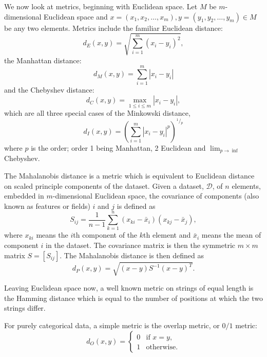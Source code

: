 \documentclass[a4paper]{report}
\newcommand{\dset}{\mathcal{D}}
\newcommand{\prettyfrac}[2]{^#1\!/\!_#2}
\begin{document}
We now look at metrics, beginning with Euclidean space.  Let $M$ be
$m$-dimensional Euclidean space and $x=(x_1,x_2,\dotsc,x_m),
y=(y_1,y_2,\dotsc,y_m) \in M$ be any two elements.  Metrics include the
familiar Euclidean distance:
\begin{equation*}
  d_E(x,y) = \sqrt{\sum_{i=1}^{m} (x_i - y_i)^2},
\end{equation*}
the Manhattan distance:
\begin{equation*}
  d_{M}(x,y) = \sum_{i=1}^{m} |x_i - y_i|
\end{equation*}
and the Chebyshev distance:
\begin{equation*}
  d_C(x,y) = \max_{1 \leq i \leq m} |x_i - y_i|,
\end{equation*}
which are all three special cases of the Minkowski distance,
\begin{equation*}
  d_{I}(x,y) = \left(\sum_{i=1}^{m} |x_i - y_i|^{p}\right)^{\prettyfrac{1}{p}}
\end{equation*}
where $p$ is the order; order 1 being Manhattan, 2 Euclidean and $\lim_{p \to
  \inf}$ Chebyshev.

The Mahalanobis distance \citep{mahalanobis30distance} is a metric which is
equivalent to Euclidean distance on scaled principle components of the
dataset.  Given a dataset, $\dset$, of $n$ elements, embedded in
$m$-dimensional Euclidean space, the covariance of components (also known as
features or fields) $i$ and $j$ is defined as
\begin{equation*}
  S_{ij} = \frac{1}{n-1} \sum_{k=1}^{n} (x_{ki}-\bar{x}_i)(x_{kj}-\bar{x}_j),
\end{equation*}
where $x_{ki}$ means the $i$th component of the $k$th element and $\bar{x}_i$
means the mean of component $i$ in the dataset.  The covariance matrix is then
the symmetric $m \times m$ matrix $S = [S_{ij}]$.  The Mahalanobis distance is
then defined as
\begin{equation*}
  d_{P}(x,y) = \sqrt{(x-y)S^{-1}(x-y)^T}.
\end{equation*}

Leaving Euclidean space now, a well known metric on strings of equal length is
the Hamming distance \citep{hamming50errorcodes} which is equal to the number
of positions at which the two strings differ.

For purely categorical data, a simple metric is the overlap metric, or $0/1$
metric:
\begin{equation*}
  d_O(x,y) =
  \begin{cases}
    0 & \text{if $x=y$,} \\
    1 & \text{otherwise.}
  \end{cases}
\end{equation*}
\end{document}
